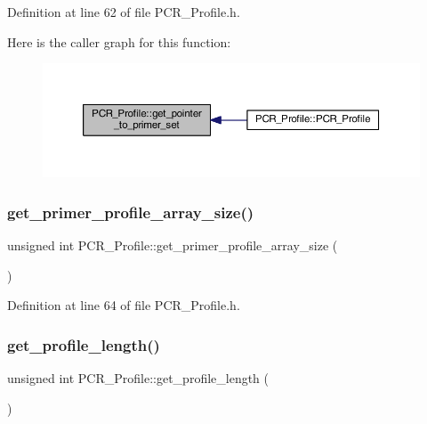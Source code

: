 Definition at line 62 of file P\+C\+R\+\_\+\+Profile.\+h.

Here is the caller graph for this function\+:
\nopagebreak
\begin{figure}[H]
\begin{center}
\leavevmode
\includegraphics[width=350pt]{class_p_c_r___profile_a24577af6213a4f6ae4215d19836c5673_icgraph}
\end{center}
\end{figure}
\mbox{\label{class_p_c_r___profile_a43b9d518bca0cd7f37ce008fcfa1b37b}} 
\subsubsection{\texorpdfstring{get\+\_\+primer\+\_\+profile\+\_\+array\+\_\+size()}{get\_primer\_profile\_array\_size()}}
{\footnotesize\ttfamily unsigned int P\+C\+R\+\_\+\+Profile\+::get\+\_\+primer\+\_\+profile\+\_\+array\+\_\+size (\begin{DoxyParamCaption}{ }\end{DoxyParamCaption})\hspace{0.3cm}{\ttfamily [inline]}}



Definition at line 64 of file P\+C\+R\+\_\+\+Profile.\+h.

\mbox{\label{class_p_c_r___profile_ad25903940b769ad48abaf472175e5ccf}} 
\subsubsection{\texorpdfstring{get\+\_\+profile\+\_\+length()}{get\_profile\_length()}}
{\footnotesize\ttfamily unsigned int P\+C\+R\+\_\+\+Profile\+::get\+\_\+profile\+\_\+length (\begin{DoxyParamCaption}{ }\end{DoxyParamCaption})\hspace{0.3cm}{\ttfamily [inline]}}



